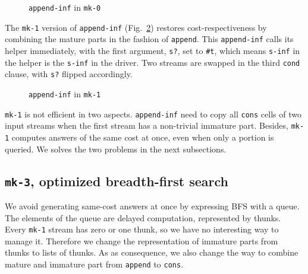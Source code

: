 \documentclass[format=acmlarge, review=true, authordraft=true]{acmart}
\begin{document}
\begin{figure}
	 	
	 \caption{\texttt{append-inf} in \texttt{mk-0}}
	 \label{append-inf-0}
\end{figure}

The \texttt{mk-1} version of \texttt{append-inf} (Fig.~\ref{append-inf-1}) restores cost-respectiveness by combining the mature parts in the fashion of \texttt{append}. This \texttt{append-inf} calls its helper immediately, with the first argument, \texttt{s?}, set to \texttt{\#{}t}, which means \texttt{s-inf} in the helper is the \texttt{s-inf} in the driver. Two streams are swapped in the third \texttt{cond} clause, with \texttt{s?} flipped accordingly.

\begin{figure}
	 	
	 \caption{\texttt{append-inf} in \texttt{mk-1}}
	 \label{append-inf-1}
\end{figure}

\texttt{mk-1} is not efficient in two aspects. \texttt{append-inf} need to copy all \texttt{cons} cells of two input streams when the first stream has a non-trivial immature part. Besides, \texttt{mk-1} computes answers of the same cost at once, even when only a portion is queried. We solves the two problems in the next subsections.

\subsection{\texttt{mk-3}, optimized breadth-first search}

We avoid generating same-cost answers at once by expressing BFS with a queue. The elements of the queue are delayed computation, represented by thunks. Every \texttt{mk-1} stream has zero or one thunk, so we have no interesting way to manage it. Therefore we change the representation of immature parts from thunks to lists of thunks. As as consequence, we also change the way to combine mature and immature part from \texttt{append} to \texttt{cons}. 
\end{document}
